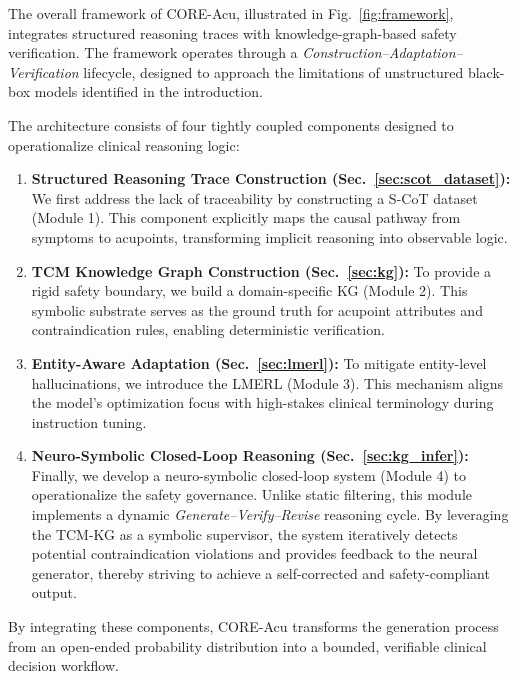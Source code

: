 \documentclass[preprint,5p,times,twocolumn,fleqn]{elsarticle}
\begin{document}
The overall framework of CORE-Acu, illustrated in Fig.~\ref{fig:framework}, integrates structured reasoning traces with knowledge-graph-based safety verification. 
The framework operates through a \textit{Construction--Adaptation--Verification} lifecycle, designed to approach the limitations of unstructured black-box models identified in the introduction.

The architecture consists of four tightly coupled components designed to operationalize clinical reasoning logic:

\begin{enumerate}
    \item \textbf{Structured Reasoning Trace Construction (Sec.~\ref{sec:scot_dataset}):} We first address the lack of traceability by constructing a S-CoT dataset (Module 1). This component explicitly maps the causal pathway from symptoms to acupoints, transforming implicit reasoning into observable logic.
    \item \textbf{TCM Knowledge Graph Construction (Sec.~\ref{sec:kg}):} To provide a rigid safety boundary, we build a domain-specific KG (Module 2). This symbolic substrate serves as the ground truth for acupoint attributes and contraindication rules, enabling deterministic verification.
    \item \textbf{Entity-Aware Adaptation (Sec.~\ref{sec:lmerl}):} To mitigate entity-level hallucinations, we introduce the LMERL (Module 3). This mechanism aligns the model's optimization focus with high-stakes clinical terminology during instruction tuning.
    \item \textbf{Neuro-Symbolic Closed-Loop Reasoning (Sec.~\ref{sec:kg_infer}):} 
    Finally, we develop a neuro-symbolic closed-loop system (Module 4) to operationalize the safety governance. 
    Unlike static filtering, this module implements a dynamic \textit{Generate--Verify--Revise}  reasoning cycle. 
    By leveraging the TCM-KG as a symbolic supervisor, the system iteratively detects potential contraindication violations and provides feedback to the neural generator, thereby striving to achieve a self-corrected and safety-compliant output.
\end{enumerate}

By integrating these components, CORE-Acu transforms the generation process from an open-ended probability distribution into a bounded, verifiable clinical decision workflow.

\end{document}
